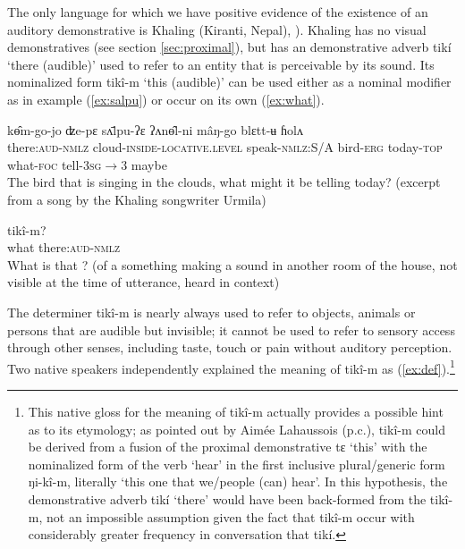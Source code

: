\documentclass[oneside,a4paper,11pt]{article}
\newcommand{\ipa}[1]{{\phon \mbox{#1}}} %
\begin{document}
The only language for which we have positive evidence of the existence of an auditory demonstrative is Khaling (Kiranti, Nepal), \citealt{jacques14auditory}). Khaling has no visual demonstratives (see section \ref{sec:proximal}), but has an demonstrative adverb \ipa{tikí} `there (audible)' used to refer to an entity that is perceivable by its sound. Its nominalized form \ipa{tikî-m} `this (audible)' can be used either as a nominal modifier as in  example (\ref{ex:salpu}) or occur on its own (\ref{ex:what}). 

\begin{exe}
\ex \label{ex:salpu}
\gll    	 	\ipa{tikî-m}   	\ipa{kɵ̂m-go-jo}   	\ipa{ʣe-pɛ}   	\ipa{sʌ̄lpu-ʔɛ}   	\ipa{ʔʌnɵ̂l-ni}   	\ipa{mâŋ-go}   	\ipa{blɛtt-ʉ}   	\ipa{ɦolʌ}   
 \\
 there:\textsc{aud}-\textsc{nmlz} cloud-\textsc{inside-locative.level} speak-\textsc{nmlz:}S/A bird-\textsc{erg} today-\textsc{top} what-\textsc{foc} tell-\textsc{3sg$\rightarrow$3} maybe \\
\glt The bird that is singing in the clouds, what might it be telling today? (excerpt from a song by the Khaling songwriter Urmila)
\end{exe}

\begin{exe}
\ex \label{ex:what}
\gll  	\ipa{mâŋ}  	 	\ipa{tikî-m?}   \\
what  there:\textsc{aud}-\textsc{nmlz} \\
\glt What is that ? (of a something making a sound in another room of the house, not visible at the time of utterance, heard in context)
\end{exe}

The determiner \ipa{tikî-m} is nearly always used to refer to objects, animals or persons  that are audible but invisible; it cannot be used to refer to sensory access through other senses, including taste, touch or pain without auditory perception. Two native speakers independently explained the meaning of  \ipa{tikî-m} as (\ref{ex:def}).\footnote{This native gloss for the meaning of \ipa{tikî-m} actually provides a possible hint as to its etymology; as pointed out by Aimée Lahaussois (p.c.), \ipa{tikî-m} could be derived from a fusion of the proximal demonstrative \ipa{tɛ} `this' with the nominalized form of the verb `hear' in the first inclusive plural/generic form \ipa{ŋi-kî-m}, literally `this one that we/people (can) hear'. In this hypothesis, the demonstrative adverb \ipa{tikí} `there' would have been back-formed from the \ipa{tikî-m}, not an impossible assumption given the fact that  \ipa{tikî-m} occur with considerably greater frequency in conversation that  \ipa{tikí}. }
\end{document}
